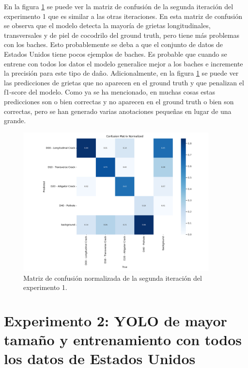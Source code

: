 En la figura \ref{fig:exp1-cv1-confusion_matrix_normalized} se puede ver la matriz de confusión de la segunda iteración del experimento 1 que es similar a las otras iteraciones. En esta matriz de confusión se observa que el modelo detecta la mayoría de grietas longitudinales, transversales y de piel de cocodrilo del ground truth, pero tiene más problemas con los baches. Esto probablemente se deba a que el conjunto de datos de Estados Unidos tiene pocos ejemplos de baches. Es probable que cuando se entrene con todos los datos el modelo generalice mejor a los baches e incremente la precisión para este tipo de daño. Adicionalmente, en la figura \ref{fig:exp1-cv1-confusion_matrix_normalized} se puede ver las predicciones de grietas que no aparecen en el ground truth y que penalizan el f1-score del modelo. Como ya se ha mencionado, en muchas cosas estas predicciones son o bien correctas y no aparecen en el ground truth o bien son correctas, pero se han generado varias anotaciones pequeñas en lugar de una grande.

\begin{figure}[H]
    \centering
    \includegraphics[width=0.9\textwidth]{img/exp1-cv1-confusion_matrix_normalized.png}
    \caption{Matriz de confusión normalizada de la segunda iteración del experimento 1.}
    \label{fig:exp1-cv1-confusion_matrix_normalized}
\end{figure}

\section{Experimento 2: YOLO de mayor tamaño y entrenamiento con todos los datos de Estados Unidos}\label{SEC:EXP2}

